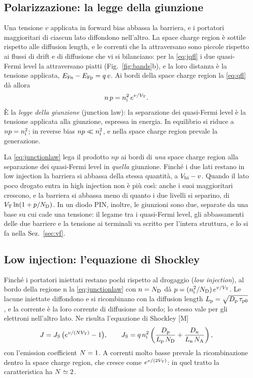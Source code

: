 \documentclass[10pt,a4paper]{scrartcl}
\let\newcommand\pdvaluedefine
\newcommand{\VT}{V_\mathrm{T}}
\newcommand{\Nem}{N}                          %
\newcommand{\ND}{N_\mathrm{D}}
\newcommand{\NA}{N_\mathrm{A}}
\newcommand{\nint}{n_\mathrm{i}}
\newcommand{\Dn}{D_\mathrm{n}}
\newcommand{\Dp}{D_\mathrm{p}}
\newcommand{\Vbi}{V_\mathrm{bi}}
\newcommand{\EFn}{E_\mathrm{Fn}}
\newcommand{\EFp}{E_\mathrm{Fp}}
\begin{document}
\subsection{Polarizzazione: la legge della giunzione}
\label{sec:bias}
Una tensione $v$ applicata in forward bias abbassa la barriera, e i portatori maggioritari di ciascun lato diffondono nell'altro. La space charge region è sottile rispetto alle diffusion length, e le correnti che la attraversano sono piccole rispetto ai flussi di drift e di diffusione che vi si bilanciano: per la \eqref{eq:jqfl} i due quasi-Fermi level la attraversano piatti (Fig.~\ref{fig:bands}b), e la loro distanza è la tensione applicata, $\EFn - \EFp = q\,v$. Ai bordi della space charge region la \eqref{eq:qfl} dà allora
\begin{equation}
n\,p = \nint^2\,e^{v/\VT} .
\label{eq:junctionlaw}
\end{equation}
È la \emph{legge della giunzione} (junction law): la separazione dei quasi-Fermi level è la tensione applicata alla giunzione, espressa in energia. In equilibrio si riduce a $np = \nint^2$; in reverse bias $np \ll \nint^2$, e nella space charge region prevale la generazione.

La \eqref{eq:junctionlaw} lega il prodotto $np$ ai bordi di \emph{una} space charge region alla separazione dei quasi-Fermi level in \emph{quella} giunzione. Finché i due lati restano in low injection la barriera si abbassa della stessa quantità, a $\Vbi - v$. Quando il lato poco drogato entra in high injection non è più così: anche i suoi maggioritari crescono, e la barriera si abbassa meno di quanto i due livelli si separino, di $\VT\ln(1+p/\ND)$. In un diodo PIN, inoltre, le giunzioni sono due, separate da una base su cui cade una tensione: il legame tra i quasi-Fermi level, gli abbassamenti delle due barriere e la tensione ai terminali va scritto per l'intera struttura, e lo si fa nella Sez.~\ref{sec:vf}.

\subsection{Low injection: l'equazione di Shockley}
\label{sec:shockley}
Finché i portatori iniettati restano pochi rispetto al drogaggio (\emph{low injection}), al bordo della regione n la \eqref{eq:junctionlaw} con $n = \ND$ dà $p = (\nint^2/\ND)\,e^{v/\VT}$. Le lacune iniettate diffondono e si ricombinano con la diffusion length $L_\mathrm{p} = \sqrt{\Dp\,\tau_\mathrm{p0}}$, e la corrente è la loro corrente di diffusione al bordo; lo stesso vale per gli elettroni nell'altro lato. Ne risulta l'equazione di Shockley [M] \cite{sze}
\begin{equation}
J = J_\mathrm{S}\,\bigl(e^{v/(\Nem\VT)} - 1\bigr) , \qquad
J_\mathrm{S} = q\,\nint^2\left(\frac{\Dp}{L_\mathrm{p}\,\ND} + \frac{\Dn}{L_\mathrm{n}\,\NA}\right) ,
\label{eq:shockley}
\end{equation}
con l'emission coefficient $\Nem = 1$. A correnti molto basse prevale la ricombinazione dentro la space charge region, che cresce come $e^{v/(2\VT)}$: in quel tratto la caratteristica ha $\Nem \simeq 2$.
\end{document}
